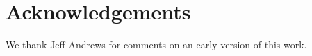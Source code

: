 \documentclass[modern]{aastex631}
\begin{document}
\label{sec:conclusion}
\section{Acknowledgements}
\begin{acknowledgments}
    We thank Jeff Andrews for comments on an early version of this work.
\end{acknowledgments}


\clearpage


\end{document}
